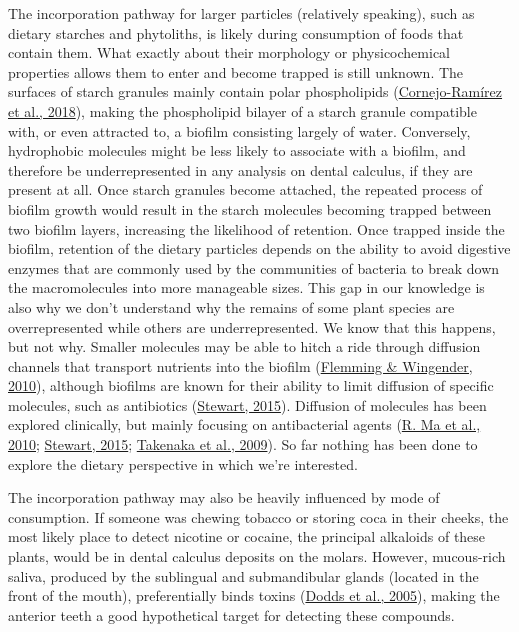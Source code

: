 \documentclass[
  b5paper,
]{book}
\begin{document}
The incorporation pathway for larger particles (relatively speaking),
such as dietary starches and phytoliths, is likely during consumption of
foods that contain them. What exactly about their morphology or
physicochemical properties allows them to enter and become trapped is
still unknown. The surfaces of starch granules mainly contain polar
phospholipids
(\protect\hyperlink{ref-cornejo-ramirezStructuralCharacteristics2018}{Cornejo-Ramírez
et al., 2018}), making the phospholipid bilayer of a starch granule
compatible with, or even attracted to, a biofilm consisting largely of
water. Conversely, hydrophobic molecules might be less likely to
associate with a biofilm, and therefore be underrepresented in any
analysis on dental calculus, if they are present at all. Once starch
granules become attached, the repeated process of biofilm growth would
result in the starch molecules becoming trapped between two biofilm
layers, increasing the likelihood of retention. Once trapped inside the
biofilm, retention of the dietary particles depends on the ability to
avoid digestive enzymes that are commonly used by the communities of
bacteria to break down the macromolecules into more manageable sizes.
This gap in our knowledge is also why we don't understand why the
remains of some plant species are overrepresented while others are
underrepresented. We know that this happens, but not why. Smaller
molecules may be able to hitch a ride through diffusion channels that
transport nutrients into the biofilm
(\protect\hyperlink{ref-flemmingBiofilmMatrix2010}{Flemming \&
Wingender, 2010}), although biofilms are known for their ability to
limit diffusion of specific molecules, such as antibiotics
(\protect\hyperlink{ref-stewartAntimicrobialTolerance2015}{Stewart,
2015}). Diffusion of molecules has been explored clinically, but mainly
focusing on antibacterial agents
(\protect\hyperlink{ref-maModelingDiffusion2010}{R. Ma et al., 2010};
\protect\hyperlink{ref-stewartAntimicrobialTolerance2015}{Stewart,
2015};
\protect\hyperlink{ref-takenakaDiffusionMacromolecules2009}{Takenaka et
al., 2009}). So far nothing has been done to explore the dietary
perspective in which we're interested.

The incorporation pathway may also be heavily influenced by mode of
consumption. If someone was chewing tobacco or storing coca in their
cheeks, the most likely place to detect nicotine or cocaine, the
principal alkaloids of these plants, would be in dental calculus
deposits on the molars. However, mucous-rich saliva, produced by the
sublingual and submandibular glands (located in the front of the mouth),
preferentially binds toxins
(\protect\hyperlink{ref-doddsHealthBenefits2005}{Dodds et al., 2005}),
making the anterior teeth a good hypothetical target for detecting these
compounds.
\end{document}
